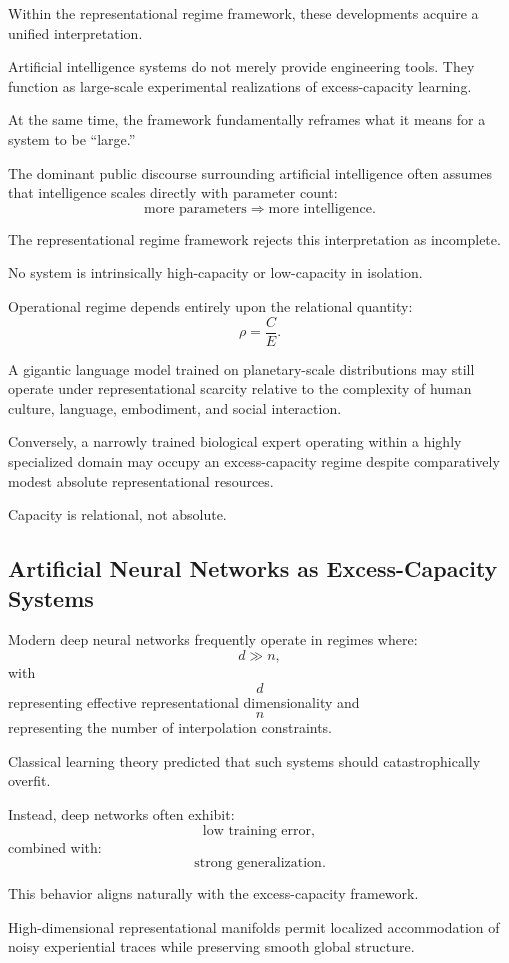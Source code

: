\documentclass[12pt,a4paper]{article}
\begin{document}
Within the representational regime framework, these developments acquire a unified interpretation.

Artificial intelligence systems do not merely provide engineering tools. They function as large-scale experimental realizations of excess-capacity learning.

At the same time, the framework fundamentally reframes what it means for a system to be “large.”

The dominant public discourse surrounding artificial intelligence often assumes that intelligence scales directly with parameter count:
\[
\text{more parameters}
\Rightarrow
\text{more intelligence}.
\]

The representational regime framework rejects this interpretation as incomplete.

No system is intrinsically high-capacity or low-capacity in isolation.

Operational regime depends entirely upon the relational quantity:
\[
\rho
=
\frac{C}{E}.
\]

A gigantic language model trained on planetary-scale distributions may still operate under representational scarcity relative to the complexity of human culture, language, embodiment, and social interaction.

Conversely, a narrowly trained biological expert operating within a highly specialized domain may occupy an excess-capacity regime despite comparatively modest absolute representational resources.

Capacity is relational, not absolute.

\subsection{Artificial Neural Networks as Excess-Capacity Systems}

Modern deep neural networks frequently operate in regimes where:
\[
d \gg n,
\]
with
\[
d
\]
representing effective representational dimensionality and
\[
n
\]
representing the number of interpolation constraints.

Classical learning theory predicted that such systems should catastrophically overfit.

Instead, deep networks often exhibit:
\[
\text{low training error},
\]
combined with:
\[
\text{strong generalization}.
\]

This behavior aligns naturally with the excess-capacity framework.

High-dimensional representational manifolds permit localized accommodation of noisy experiential traces while preserving smooth global structure.
\end{document}
